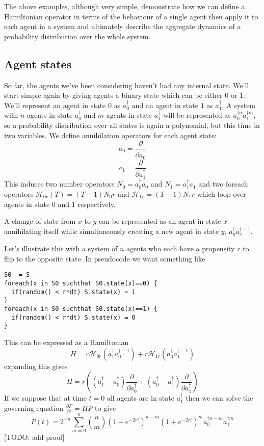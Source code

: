 \documentclass[letterpaper,twocolumn,10pt]{article}
\begin{document}
The above examples, although very simple, demonstrate how we can define a Hamiltonian operator in terms of the behaviour of a single agent then apply it to each agent in a system and ultimately describe the aggregate dynamics of a probability distribution over the whole system.



\subsection{Agent states}

So far, the agents we've been considering haven't had any internal state. We'll start simple again by giving agents a binary state which can be either $0$ or $1$. We'll represent an agent in state $0$ as $a^\dag_0$ and an agent in state $1$ as $a^\dag_1$. A system with $n$ agents in state $a^\dag_0$ and $m$ agents in state $a^\dag_1$ will be represented as $a^{\dag n}_0 a^{\dag m}_1$, so a probability distribution over all states is again a polynomial, but this time in two variables. We define annihilation operators for each agent state:
\[
a_0 = \frac{\partial}{\partial a^\dag_0}
\]
\[
a_1 = \frac{\partial}{\partial a^\dag_1}
\]
This induces two number operators $N_0 = a_0^\dag a_0$ and $N_1 = a_1^\dag a_1$ and two foreach operators $\mathcal{H}_{0r}(T) = (T-1)N_0r$ and $\mathcal{H}_{1r} = (T-1)N_1r$ which loop over agents in state $0$ and $1$ respectively.

A change of state from $x$ to $y$ can be represented as an agent in state $x$ annihilating itself while simultaneously creating a new agent in state $y$, $a_y^\dag a_x^{\dag-1}$.

Let's illustrate this with a system of $n$ agents who each have a propensity $r$ to flip to the opposite state. In pseudocode we want something like
\begin{verbatim}
S0  = S
foreach(x in S0 suchthat S0.state(x)==0) {
  if(random() < r*dt) S.state(x) = 1
}
foreach(x in S0 suchthat S0.state(x)==1) {
  if(random() < r*dt) S.state(x) = 0
}
\end{verbatim}
 This can be expressed as a Hamiltonian
\[
H = r\mathcal{H}_{0r}(a^\dag_1 a^{\dag -1}_0) + r\mathcal{H}_{1r}(a^\dag_0 a^{\dag -1}_1)
\]
expanding this gives
\[
H = r\left((a^\dag_1 - a^\dag_0)\frac{\partial}{\partial a^\dag_0} + (a^\dag_0 - a^\dag_1)\frac{\partial}{\partial a^\dag_1}\right)
\]
If we suppose that at time $t = 0$ all agents are in state $a^\dag_1$ then we can solve the governing equation $\frac{\partial P}{\partial t} = HP$ to give
\[
P(t) = 2^{-n} \sum_{m=0}^n {n\choose m} (1-e^{-2rt})^{n-m}(1+e^{-2rt})^m a^{\dag n-m}_0 a^{\dag m}_1
\]
[TODO: add proof]
\end{document}
